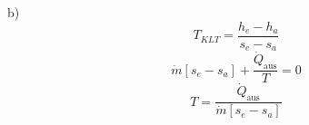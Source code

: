 b) 
\[
T_{KLT} = \frac{h_e - h_a}{s_e - s_a}
\]
\[
\dot{m} [s_e - s_a] + \frac{\dot{Q}_{\text{aus}}}{T} = 0
\]
\[
T = \frac{\dot{Q}_{\text{aus}}}{\dot{m} [s_e - s_a]}
\]